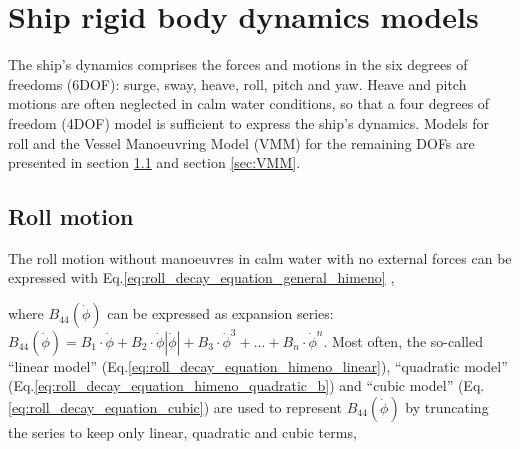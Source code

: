 \chapter{Ship rigid body dynamics models}
\label{ch:models}

The ship's dynamics comprises the forces and motions in the six degrees of freedoms (6DOF): surge, sway, heave, roll, pitch and yaw. Heave and pitch motions are often neglected in calm water conditions, so that a four degrees of freedom (4DOF) model is sufficient to express the ship's dynamics. Models for roll and the Vessel Manoeuvring Model (VMM) for the remaining DOFs are presented in section \ref{sec:roll} and section \ref{sec:VMM}. 

\section{Roll motion} \label{sec:roll}

The roll motion without manoeuvres in calm water with no external forces can be expressed with Eq.\ref{eq:roll_decay_equation_general_himeno} \cite{himeno_prediction_1981},


\noindent where $B_{44}\left(\dot{\phi}\right)$ can be expressed as expansion series:  
$ B_{44}\left(\dot{\phi}\right) = B_1\cdot\dot{\phi} + B_2\cdot\dot{\phi}\left|\dot{\phi}\right| + B_3\cdot\dot{\phi}^3 + ... + B_n\cdot\dot{\phi}^n$. Most often, the so-called ``linear model'' (Eq.\ref{eq:roll_decay_equation_himeno_linear}), ``quadratic model'' (Eq.\ref{eq:roll_decay_equation_himeno_quadratic_b}) and ``cubic model'' (Eq.\ref{eq:roll_decay_equation_cubic}) are used to represent $B_{44}(\dot{\phi})$ by truncating the series to keep only linear, quadratic and cubic terms,






